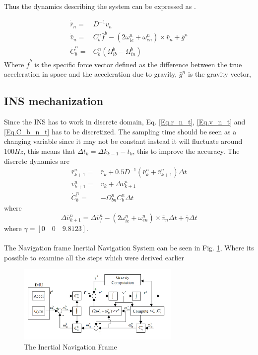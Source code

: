 Thus the dynamics describing the system can be expressed as \cite{nonlinear}.

\begin{align}
\dot{\bar{r}}_n = & D^{-1}v_n
\label{Eq.r_n_t}\\
\dot{\bar{v}}_n = & C_b^n \bar{f}^b-(2\omega_{ie}^n+\omega_{en}^n) \times \bar{v}_n +\bar{g}^n
\label{Eq.v_n_t}\\
\dot{C}_b^n = & C_b^n(\Omega_{ib}^b - \Omega_{in}^b)
\label{Eq.C_b_n_t}
\end{align}
Where $\bar{f}^b$ is the specific force vector defined as the difference between the true acceleration in
space and the acceleration due to gravity, $\bar{g}^n$ is the gravity vector,


\subsection{INS mechanization}
Since the INS has to work in discrete domain, Eq. \eqref{Eq.r_n_t}, \eqref{Eq.v_n_t} and \eqref{Eq.C_b_n_t} has to be discretized. The sampling time should be seen as a changing variable since it may not be constant instead it will fluctuate around $100Hz$, this means that $\Delta t_k = \Delta k_{k-1} - t_{k}$, this to improve the accuracy. The discrete dynamics are \cite{non-linear}
\begin{align}
\bar{r}_{k+1}^n = & \bar{r}_k + 0.5D^{-1}(\bar{v}_k^n + \bar{v}_{k+1}^n)\Delta t
\label{Eq.r_n_d}\\
v_{k+1}^n= & \bar{v}_k + \Delta \bar{v}_{k+1}^n
\label{Eq.v_n_d}\\
\dot{C}_b^n = & -\Omega_{bn}^n C_b^n \Delta t
\label{Eq.C_b_n_d}
\end{align}
where 
\begin{equation}
\Delta \bar{v}_{k+1}^n = \Delta \bar{v}_f^n - (2\omega_{ie}^n+\omega_{en}^n) \times \bar{v}_n \Delta t +\bar{\gamma}\Delta t
\end{equation}
where $\gamma = [0 \quad 0 \quad 9.8123]$.\\ \\
The Navigation frame Inertial Navigation System can be seen in Fig. \ref{Fig:body_frame}, Where its possible to examine all the steps which were derived earlier
\begin{figure}[H]
\centering
\includegraphics[width=0.7\textwidth]{Figures/ins_2}
\caption{The Inertial Navigation Frame}
\label{Fig:body_frame}
\end{figure}
